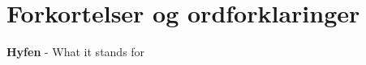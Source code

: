 \chapter*{Forkortelser og ordforklaringer}

\begin{description}
\item \textbf{Hyfen} - What it stands for


 




\end{description}




